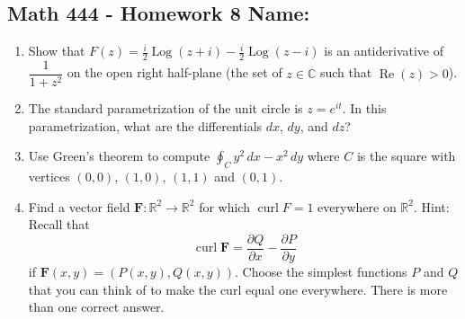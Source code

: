 \documentclass[11pt]{article}
\newcommand{\ds}{\displaystyle}
\newcommand{\R}{\mathbb{R}}
\newcommand{\C}{\mathbb{C}}
\newcommand{\re}{\operatorname{Re}}
\newcommand{\on}{\operatorname}
\newcommand{\Log}{\on{Log}}
\begin{document}
\pagestyle{empty}
\subsection*{Math 444 - Homework 8 \hfill Name: \underline{\hspace*{2in}}}
\noindent

\begin{enumerate}

\item Show that $F(z) = \frac{i}{2} \Log(z + i) - \frac{i}{2} \Log(z- i)$ is an antiderivative of $\dfrac{1}{1+z^2}$ on the open right half-plane (the set of $z \in \C$ such that $\re(z) > 0$).
\vfill  

\item The standard parametrization of the unit circle is $z = e^{it}$. In this parametrization, what are the differentials $dx$, $dy$, and $dz$?  
\vfill


\item Use Green's theorem to compute $\ds \oint_C y^2 \, dx - x^2 \, dy$ where $C$ is the square with vertices $(0,0)$, $(1,0)$, $(1,1)$ and $(0,1)$. 
\vfill

\newpage
\item Find a vector field $\mathbf{F}: \R^2 \rightarrow \R^2$ for which $\on{curl} F = 1$ everywhere on $\R^2$. Hint: Recall that  
$$\ds \on{curl} \mathbf{F} = \frac{\partial Q}{\partial x} - \frac{\partial P}{\partial y}$$
if $\mathbf{F}(x,y) = (P(x,y),Q(x,y))$. Choose the simplest functions $P$ and $Q$ that you can think of to make the curl equal one everywhere. There is more than one correct answer.
\vfill


\end{enumerate}
\end{document}
